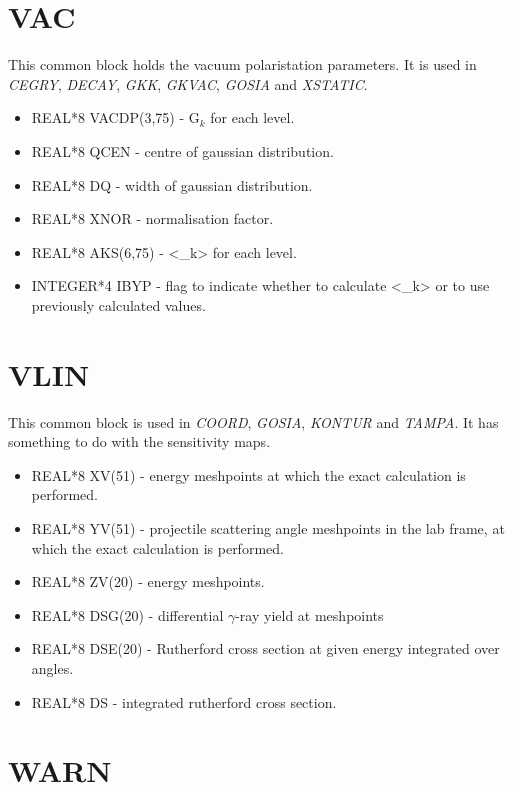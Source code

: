 \section{VAC}

This common block holds the vacuum polaristation parameters. It is used in
{\em CEGRY}, {\em DECAY}, {\em GKK}, {\em GKVAC}, {\em GOSIA} and {\em
XSTATIC}.

\begin{itemize}
\item REAL*8 VACDP(3,75) - G$_k$ for each level.
\item REAL*8 QCEN - centre of gaussian distribution.
\item REAL*8 DQ - width of gaussian distribution.
\item REAL*8 XNOR - normalisation factor.
\item REAL*8 AKS(6,75) - <\alpha_k> for each level.
\item INTEGER*4 IBYP - flag to indicate whether to calculate <\alpha_k> or
to use previously calculated values.
\end{itemize}

\section{VLIN}

This common block is used in {\em COORD}, {\em GOSIA}, {\em KONTUR} and {\em
TAMPA}. It has something to do with the sensitivity maps.

\begin{itemize}
\item REAL*8 XV(51) - energy meshpoints at which the exact calculation is
performed.
\item REAL*8 YV(51) - projectile scattering angle meshpoints in the lab
frame, at which the exact calculation is performed.
\item REAL*8 ZV(20) - energy meshpoints.
\item REAL*8 DSG(20) - differential $\gamma$-ray yield at meshpoints
\item REAL*8 DSE(20) - Rutherford cross section at given energy integrated
over angles.
\item REAL*8 DS - integrated rutherford cross section.
\end{itemize}

\section{WARN}

